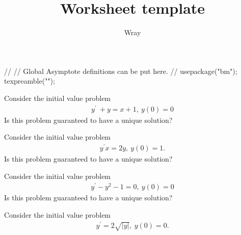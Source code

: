 \documentclass[addpoints, 12pt]{exam}
\title{Worksheet template}
\author{Wray}
\begin{document}
\begin{asydef}
//
// Global Asymptote definitions can be put here.
//
usepackage("bm");
texpreamble("\def\V#1{\bm{#1}}");
\end{asydef}

\smallskip
\begin{questions}

\question
Consider the initial value problem
\begin{align*}
	y^{\prime} \ + y = x + 1, \> y(0) = 0
\end{align*}
Is this problem guaranteed to have a unique solution?

\bigskip

\question
Consider the initial value problem
\begin{align*}
	y^{\prime} x = 2y, \> y(0) = 1.
\end{align*}
Is this problem guaranteed to have a unique solution?

\bigskip

\question
Consider the initial value problem
\begin{align*}
	y^{\prime} - y^2 - 1 = 0, \> y(0) = 0
\end{align*}
Is this problem guaranteed to have a unique solution?

\bigskip

\question
Consider the initial value problem
\begin{align*}
	y^{\prime} = 2 \sqrt{ \lvert y \rvert }, \> y(0) = 0.
\end{align*}


\end{questions}
\end{document}
